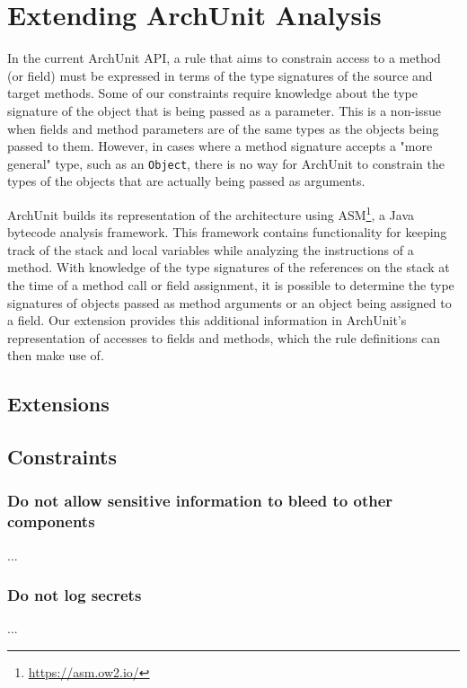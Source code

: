 \section{Extending ArchUnit Analysis}

In the current ArchUnit API, a rule that aims to constrain access to a method (or field) must be expressed in terms of the type signatures of the source and target methods. Some of our constraints require knowledge about the type signature of the object that is being passed as a parameter. This is a non-issue when fields and method parameters are of the same types as the objects being passed to them. However, in cases where a method signature accepts a "more general" type, such as an \texttt{Object}, there is no way for ArchUnit to constrain the types of the objects that are actually being passed as arguments.

ArchUnit builds its representation of the architecture using ASM\footnote{\url{https://asm.ow2.io/}}, a Java bytecode analysis framework. This framework contains functionality for keeping track of the stack and local variables while analyzing the instructions of a method. With knowledge of the type signatures of the references on the stack at the time of a method call or field assignment, it is possible to determine the type signatures of objects passed as method arguments or an object being assigned to a field. Our extension provides this additional information in ArchUnit's representation of accesses to fields and methods, which the rule definitions can then make use of.


\subsection{Extensions}


\subsection{Constraints}


\subsubsection*{Do not allow sensitive information to bleed to other components}
...

\subsubsection*{Do not log secrets}
...
